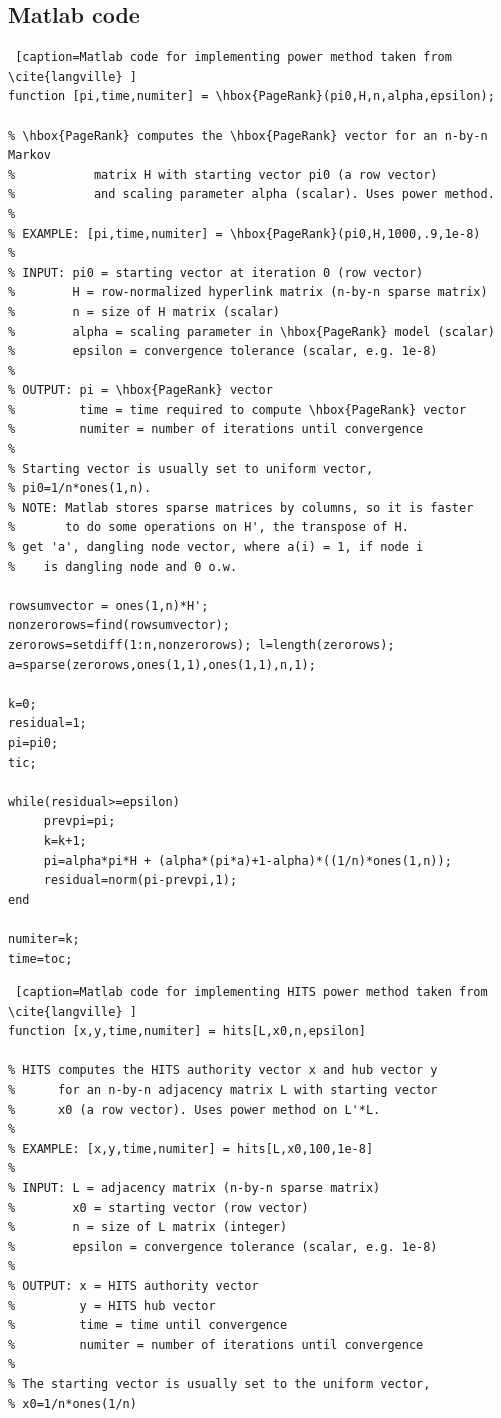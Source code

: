 \documentclass[11pt]{report}
\begin{document}
\begin{appendices}
\chapter{Matlab code} \label{app:code}

\begin{lstlisting} [caption=Matlab code for implementing power method taken from \cite{langville} ]
function [pi,time,numiter] = \hbox{PageRank}(pi0,H,n,alpha,epsilon);

% \hbox{PageRank} computes the \hbox{PageRank} vector for an n-by-n Markov
%           matrix H with starting vector pi0 (a row vector)
%           and scaling parameter alpha (scalar). Uses power method.
%
% EXAMPLE: [pi,time,numiter] = \hbox{PageRank}(pi0,H,1000,.9,1e-8)
%
% INPUT: pi0 = starting vector at iteration 0 (row vector)
%        H = row-normalized hyperlink matrix (n-by-n sparse matrix)
%        n = size of H matrix (scalar)
%        alpha = scaling parameter in \hbox{PageRank} model (scalar)
%        epsilon = convergence tolerance (scalar, e.g. 1e-8)
%
% OUTPUT: pi = \hbox{PageRank} vector
%         time = time required to compute \hbox{PageRank} vector
%         numiter = number of iterations until convergence
%        
% Starting vector is usually set to uniform vector,
% pi0=1/n*ones(1,n).
% NOTE: Matlab stores sparse matrices by columns, so it is faster
%       to do some operations on H', the transpose of H.
% get 'a', dangling node vector, where a(i) = 1, if node i 
%    is dangling node and 0 o.w.

rowsumvector = ones(1,n)*H';
nonzerorows=find(rowsumvector);
zerorows=setdiff(1:n,nonzerorows); l=length(zerorows);
a=sparse(zerorows,ones(1,1),ones(1,1),n,1);

k=0;
residual=1;
pi=pi0;
tic;

while(residual>=epsilon)
     prevpi=pi;
     k=k+1;
     pi=alpha*pi*H + (alpha*(pi*a)+1-alpha)*((1/n)*ones(1,n));
     residual=norm(pi-prevpi,1);
end

numiter=k;
time=toc;

\end{lstlisting}

\begin{lstlisting} [caption=Matlab code for implementing HITS power method taken from \cite{langville} ]
function [x,y,time,numiter] = hits[L,x0,n,epsilon]

% HITS computes the HITS authority vector x and hub vector y 
%      for an n-by-n adjacency matrix L with starting vector
%      x0 (a row vector). Uses power method on L'*L.
%
% EXAMPLE: [x,y,time,numiter] = hits[L,x0,100,1e-8]
%
% INPUT: L = adjacency matrix (n-by-n sparse matrix)
%        x0 = starting vector (row vector)
%        n = size of L matrix (integer)
%        epsilon = convergence tolerance (scalar, e.g. 1e-8)
%
% OUTPUT: x = HITS authority vector
%         y = HITS hub vector
%         time = time until convergence
%         numiter = number of iterations until convergence
%        
% The starting vector is usually set to the uniform vector,
% x0=1/n*ones(1/n)


\end{lstlisting}
\end{appendices}
\end{document}
